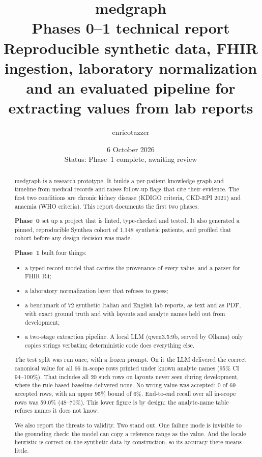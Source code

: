 \documentclass[11pt,a4paper]{article}
\title{\textbf{medgraph}\\[6pt]
  \Large Phases 0--1 technical report\\[4pt]
  \normalsize Reproducible synthetic data, FHIR ingestion, laboratory normalization\\
  and an evaluated pipeline for extracting values from lab reports}
\author{enricotazzer}
\date{6 October 2026\\[2pt]\small Status: Phase~1 complete, awaiting review}
\begin{document}
\maketitle

\begin{abstract}
\noindent medgraph is a research prototype. It builds a per-patient knowledge graph and timeline from medical records and raises follow-up flags that cite their evidence. The first two conditions are chronic kidney disease (KDIGO criteria, CKD-EPI 2021) and anaemia (WHO criteria). This report documents the first two phases.

\textbf{Phase~0} set up a project that is linted, type-checked and tested. It also generated a pinned, reproducible Synthea cohort of 1,148 synthetic patients, and profiled that cohort before any design decision was made.

\textbf{Phase~1} built four things:
\begin{itemize}[nosep]
  \item a typed record model that carries the provenance of every value, and a parser for FHIR R4;
  \item a laboratory normalization layer that refuses to guess;
  \item a benchmark of 72 synthetic Italian and English lab reports, as text and as PDF, with exact ground truth and with layouts and analyte names held out from development;
  \item a two-stage extraction pipeline. A local LLM (qwen3.5:9b, served by Ollama) only copies strings verbatim; deterministic code does everything else.
\end{itemize}

The test split was run once, with a frozen prompt. On it the LLM delivered the correct canonical value for all 66 in-scope rows printed under known analyte names (95\% CI 94--100\%). That includes all 20 such rows on layouts never seen during development, where the rule-based baseline delivered none. No wrong value was accepted: 0 of 69 accepted rows, with an upper 95\% bound of 6\%. End-to-end recall over all in-scope rows was 59.0\% (48--70\%). This lower figure is by design: the analyte-name table refuses names it does not know.

We also report the threats to validity. Two stand out. One failure mode is invisible to the grounding check: the model can copy a reference range as the value. And the locale heuristic is correct on the synthetic data by construction, so its accuracy there means little.
\end{abstract}
\end{document}
